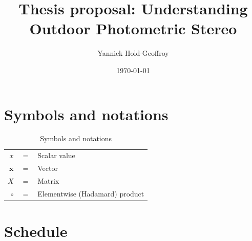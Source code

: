 \documentclass{report}
\title{Thesis proposal: Understanding Outdoor Photometric Stereo}
\author{Yannick Hold-Geoffroy}
\date{\today}
\begin{document}

\maketitle

\tableofcontents

\newcommand{\boldomega}{\boldsymbol \omega} %
\newcommand{\boldmu}{\boldsymbol \mu} %
\newcommand{\bolddelta}{\boldsymbol \delta} %

\newcommand\norm[1]{\left\lVert#1\right\rVert}

\newcommand\todo[1]{\textcolor{red}{TODO: #1}}

\graphicspath{{figures/}}


\chapter*{Symbols and notations}

\begin{table}[htbp]\caption{Symbols and notations}
\centering %
\begin{tabular}{r c p{10cm} }

\hline %
$x$                                 & $=$ & Scalar value \\
$\mathbf{x}$                        & $=$ & Vector \\
$X$                                 & $=$ & Matrix \\
$\circ$                             & $=$ & Elementwise (Hadamard) product \\
\hline
\end{tabular}
\label{tab:TableOfNotationForMyResearch}
\end{table}








\chapter{Schedule}
\end{document}
